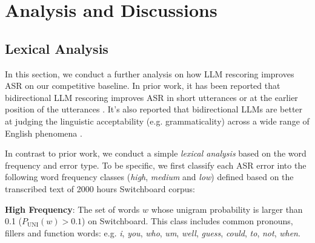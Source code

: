 \documentclass[a4paper]{article}
\begin{document}
\section{Analysis and Discussions}
\label{sec:analysis_and_discussions}

\subsection{Lexical Analysis}
\label{subsec:lexical_analysis}

In this section, we conduct a further analysis on how LLM rescoring improves ASR on our competitive baseline. In prior work, it has been reported that bidirectional LLM rescoring improves ASR in short utterances or at the earlier position of the utterances \cite{shin2019effective}. It's also reported that bidirectional LLMs are better at judging the linguistic acceptability (e.g. grammaticality) across a wide range of English phenomena \cite{salazar-etal-2020-masked,warstadt-etal-2020-blimp-benchmark}.

In contrast to prior work, we conduct a simple \textit{lexical analysis} based on the word frequency and error type. To be specific, we first classify each ASR error into the following word frequency classes (\textit{high}, \textit{medium} and \textit{low}) defined based on the transcribed text of 2000 hours Switchboard corpus:


\noindent
\textbf{High Frequency}: The set of words $w$ whose unigram probability is larger than 0.1 ($P_{\mathrm{UNI}}(w) > 0.1$) on Switchboard. This class includes common pronouns, fillers and function words: e.g. \textit{i}, \textit{you}, \textit{who}, \textit{um}, \textit{well}, \textit{guess}, \textit{could}, \textit{to}, \textit{not}, \textit{when}.
\end{document}
